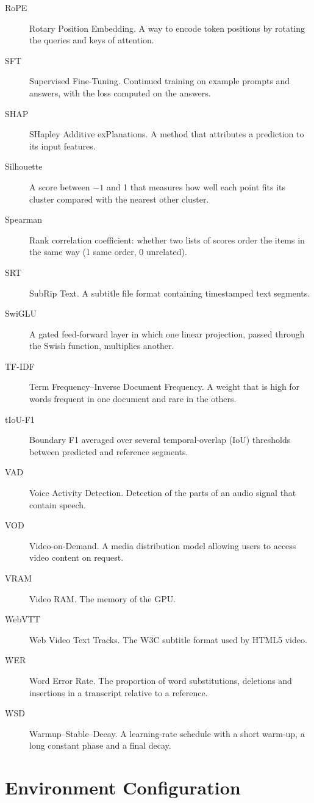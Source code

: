 \documentclass[ENG]{TFUOC}
\begin{document}
\begin{description}
\item[RoPE] Rotary Position Embedding. A way to encode token positions by rotating the queries and keys of attention.
\item[SFT] Supervised Fine-Tuning. Continued training on example prompts and answers, with the loss computed on the answers.
\item[SHAP] SHapley Additive exPlanations. A method that attributes a prediction to its input features.
\item[Silhouette] A score between $-1$ and 1 that measures how well each point fits its cluster compared with the nearest other cluster.
\item[Spearman] Rank correlation coefficient: whether two lists of scores order the items in the same way (1 same order, 0 unrelated).
\item[SRT] SubRip Text. A subtitle file format containing timestamped text segments.
\item[SwiGLU] A gated feed-forward layer in which one linear projection, passed through the Swish function, multiplies another.
\item[TF-IDF] Term Frequency--Inverse Document Frequency. A weight that is high for words frequent in one document and rare in the others.
\item[tIoU-F1] Boundary F1 averaged over several temporal-overlap (IoU) thresholds between predicted and reference segments.
\item[VAD] Voice Activity Detection. Detection of the parts of an audio signal that contain speech.
\item[VOD] Video-on-Demand. A media distribution model allowing users to access video content on request.
\item[VRAM] Video RAM. The memory of the GPU.
\item[WebVTT] Web Video Text Tracks. The W3C subtitle format used by HTML5 video.
\item[WER] Word Error Rate. The proportion of word substitutions, deletions and insertions in a transcript relative to a reference.
\item[WSD] Warmup--Stable--Decay. A learning-rate schedule with a short warm-up, a long constant phase and a final decay.
\end{description}





\newpage
\appendix

\chapter{Environment Configuration}
\label{app:env}
\end{document}
